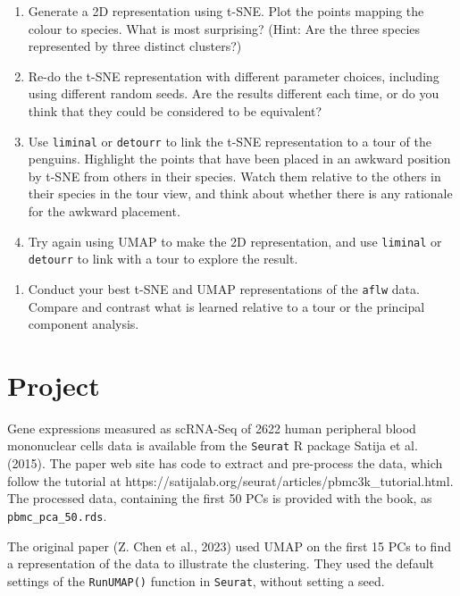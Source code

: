 \documentclass[
  letterpaper,
]{krantz}
\providecommand{\tightlist}{%
  \setlength{\itemsep}{0pt}\setlength{\parskip}{0pt}}\usepackage{longtable,booktabs,array}
\begin{document}
\begin{enumerate}
\def\labelenumi{\alph{enumi}.}
\tightlist
\item
  Generate a 2D representation using t-SNE. Plot the points mapping the
  colour to species. What is most surprising? (Hint: Are the three
  species represented by three distinct clusters?)
\item
  Re-do the t-SNE representation with different parameter choices,
  including using different random seeds. Are the results different each
  time, or do you think that they could be considered to be equivalent?
\item
  Use \texttt{liminal} or \texttt{detourr} to link the t-SNE
  representation to a tour of the penguins. Highlight the points that
  have been placed in an awkward position by t-SNE from others in their
  species. Watch them relative to the others in their species in the
  tour view, and think about whether there is any rationale for the
  awkward placement.
\item
  Try again using UMAP to make the 2D representation, and use
  \texttt{liminal} or \texttt{detourr} to link with a tour to explore
  the result.
\end{enumerate}

\begin{enumerate}
\def\labelenumi{\arabic{enumi}.}
\setcounter{enumi}{1}
\tightlist
\item
  Conduct your best t-SNE and UMAP representations of the \texttt{aflw}
  data. Compare and contrast what is learned relative to a tour or the
  principal component analysis.
\end{enumerate}

\section*{Project}\label{project-1}


Gene expressions measured as scRNA-Seq of 2622 human peripheral blood
mononuclear cells data is available from the \texttt{Seurat} R package
Satija et al. (2015). The paper web site has code to extract and
pre-process the data, which follow the tutorial at
https://satijalab.org/seurat/articles/pbmc3k\_tutorial.html. The
processed data, containing the first 50 PCs is provided with the book,
as \texttt{pbmc\_pca\_50.rds}.

The original paper (Z. Chen et al., 2023) used UMAP on the first 15 PCs
to find a representation of the data to illustrate the clustering. They
used the default settings of the \texttt{RunUMAP()} function in
\texttt{Seurat}, without setting a seed.
\end{document}
